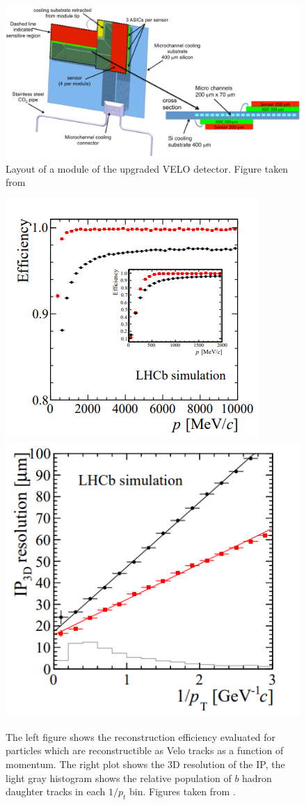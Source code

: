 \begin{figure}[!h]
\centering
\includegraphics[width=\linewidth]{figures/Velo_upgraded_module.pdf}
\caption{Layout of a module of the upgraded VELO detector. Figure taken from \cite{velo_upgrade_tdr}
\label{fig:veloUpgradeModule}}
\end{figure}




\begin{figure}[!h]
 \begin{center}
  \includegraphics[width=0.49\linewidth]{figures/Velo_upgrade_tracking.PNG}
   \includegraphics[width=0.49\linewidth]{figures/Velo_upgrade_IP.PNG}
    \caption{The left figure shows the reconstruction efficiency evaluated for particles which are reconstructible as Velo tracks as a function of momentum. The right plot shows the  3D resolution of the IP, the light gray histogram shows the relative population of $b$ hadron daughter tracks in each $1/p_t$ bin. Figures taken from \cite{velo_upgrade_tdr}.}%
    \label{fig:upgrade_velo_performance}%
 \end{center}
\end{figure}


